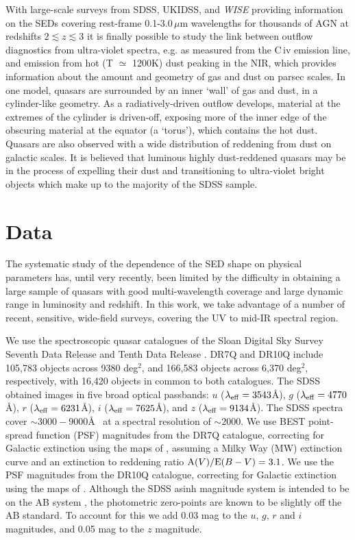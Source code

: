With large-scale surveys from SDSS, UKIDSS, and {\it WISE} providing information on the SEDs covering rest-frame 0.1-3.0\,$\mu$m wavelengths for thousands of AGN at redshifts $2 \lesssim z \lesssim 3$ it is finally possible to study the link between outflow diagnostics from ultra-violet spectra, e.g. as measured from the C\,{\sc iv} emission line, and emission from hot (T $\simeq$ 1200K) dust peaking in the NIR, which provides information about the amount and geometry of gas and dust on parsec scales. In one model, quasars are surrounded by an inner `wall' of gas and dust, in a cylinder-like geometry. As a radiatively-driven outflow develops, material at the extremes of the cylinder is driven-off, exposing more of the inner edge of the obscuring material at the equator (a `torus'), which contains the hot dust. Quasars are also observed with a wide distribution of reddening from dust on galactic scales. It is believed that luminous highly dust-reddened quasars may be in the process of expelling their dust and transitioning to  ultra-violet bright objects  which make up to the majority of the SDSS sample.

\section{Data}

The systematic study of the dependence of the SED shape on physical parameters has, until very recently, been limited by the difficulty in obtaining a large sample of quasars with good multi-wavelength coverage and large dynamic range in luminosity and redshift. In this work, we take advantage of a number of recent, sensitive, wide-field surveys, covering the UV to mid-IR spectral region. 

We use the spectroscopic quasar catalogues of the Sloan Digital Sky Survey \citep[SDSS;][]{york00} Seventh Data Release \citep[DR7Q;][]{schneider10} and Tenth Data Release \citep[DR10Q;][]{paris14}. DR7Q and DR10Q include 105,783 objects across 9380 deg$^2$, and 166,583 objects across 6,370 deg$^2$, respectively, with 16,420 objects in common to both catalogues. The SDSS obtained images in five broad optical passbands: $u$ ($\lambda_{\rm eff} = 3543$\AA), $g$ ($\lambda_{\rm eff} = 4770$\AA), $r$ ($\lambda_{\rm eff} = 6231$\AA), $i$ ($\lambda_{\rm eff} = 7625$\AA), and $z$ ($\lambda_{\rm eff} = 9134$\AA). The SDSS spectra cover $\sim 3000 - 9000$\AA~ at a spectral resolution of $\sim 2000$. We use BEST point-spread function (PSF) magnitudes from the DR7Q catalogue, correcting for Galactic extinction using the maps of \citet{schlegel98}, assuming a Milky Way (MW) extinction curve \citep{pei92} and an extinction to reddening ratio ${\rm A}(V) / {\rm E}(B-V) = 3.1$. We use the PSF magnitudes from the DR10Q catalogue, correcting for Galactic extinction using the maps of \citet{schlafly11}. Although the SDSS asinh magnitude system is intended to be on the AB system \citep{oke83}, the photometric zero-points are known to be slightly off the AB standard. To account for this we add 0.03 mag to the $u$, $g$, $r$ and $i$ magnitudes, and 0.05 mag to the $z$ magnitude.  

